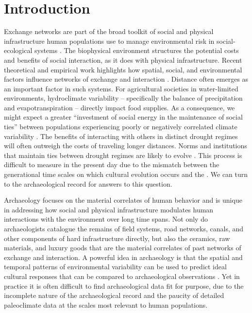 \documentclass[10pt]{iopart}
\begin{document}
\section*{Introduction}
Exchange networks are part of the broad toolkit of social and physical infrastructure human populations use to manage environmental risk in social-ecological systems \parencite{Anderies2015}. The biophysical environment structures the potential costs and benefits of social interaction, as it does with physical infrastructure. Recent theoretical and empirical work highlights how spatial, social, and environmental factors influence networks of exchange and interaction \parencite{Fafchamps2007,Bloch2008,Nolin2010,Verdery2012,Freeman2014,Koster2014,Hao2015a,Schnegg2015}. Distance often emerges as an important factor in such systems. For agricultural societies in water-limited environments, hydroclimate variability -- specifically the balance of precipitation and evapotranspiration -- directly impact food supplies. As a consequence, we might expect a greater ``investment of social energy in the maintenance of social ties'' between populations experiencing poorly or negatively correlated climate variability \parencite{Rautman1993a}. The benefits of interacting with others in distinct drought regimes will often outweigh the costs of traveling longer distances. Norms and institutions that maintain ties between drought regimes are likely to evolve \parencite{Durante2009}. This process is difficult to measure in the present day due to the mismatch between the generational time scales on which cultural evolution occurs and the . We can turn to the archaeological record for answers to this question. 

Archaeology focuses on the material correlates of human behavior and is unique in addressing how social and physical infrastructure modulates human interactions with the environment over long time spans. Not only do archaeologists catalogue the remains of field systems, road networks, canals, and other components of hard infrastructure directly, but also the ceramics, raw materials, and luxury goods that are the material correlates of past networks of exchange and interaction. A powerful idea in archaeology is that the spatial and temporal patterns of environmental variability can be used to predict ideal cultural responses that can be compared to archaeological observations \parencite{Halstead1989}. Yet in practice it is often difficult to find archaeological data fit for purpose, due to the incomplete nature of the archaeological record and the paucity of detailed paleoclimate data at the scales most relevant to human populations. 
\end{document}
